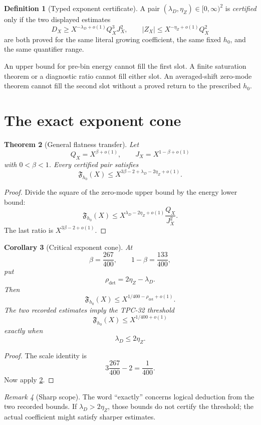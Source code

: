 \documentclass[11pt,a4paper]{article}
\newtheorem{theorem}{Theorem}[section]
\newtheorem{corollary}[theorem]{Corollary}
\theoremstyle{definition}
\newtheorem{definition}[theorem]{Definition}
\theoremstyle{remark}
\newtheorem{remark}[theorem]{Remark}
\newcommand{\Flat}{\mathfrak F}
\begin{document}
\begin{definition}[Typed exponent certificate]
A pair \((\lambda_D,\eta_Z)\in[0,\infty)^2\) is
\emph{certified} only if the two displayed estimates
\[
 D_X\ge X^{-\lambda_D+o(1)}Q_X^3J_X^2,\qquad
 |Z_X|\le X^{-\eta_Z+o(1)}Q_X^2
\]
are both proved for the same literal growing coefficient, the same
fixed \(h_0\), and the same quantifier range.
\end{definition}

An upper bound for pre-bin energy cannot fill the first slot.
A finite saturation theorem or a diagnostic ratio cannot fill either
slot.  An averaged-shift zero-mode theorem cannot fill the second
slot without a proved return to the prescribed \(h_0\).

\section{The exact exponent cone}

\begin{theorem}[General flatness transfer]
\label{thm:general}
Let
\[
 Q_X=X^{\beta+o(1)},\qquad
 J_X=X^{1-\beta+o(1)}
\]
with \(0<\beta<1\).  Every certified pair satisfies
\[
 \boxed{
 \Flat_{h_0}(X)
 \le
 X^{3\beta-2+\lambda_D-2\eta_Z+o(1)}.}
\]
\end{theorem}

\begin{proof}
Divide the square of the zero-mode upper bound by the energy lower
bound:
\[
 \Flat_{h_0}(X)
 \le
 X^{\lambda_D-2\eta_Z+o(1)}
 \frac{Q_X}{J_X^2}.
\]
The last ratio is \(X^{3\beta-2+o(1)}\).
\end{proof}

\begin{corollary}[Critical exponent cone]
\label{cor:cone}
At
\[
 \beta=\frac{267}{400},\qquad
 1-\beta=\frac{133}{400},
\]
put
\[
 \rho_{\mathrm{det}}=2\eta_Z-\lambda_D.
\]
Then
\[
 \boxed{
 \Flat_{h_0}(X)
 \le X^{1/400-\rho_{\mathrm{det}}+o(1)}.}
\]
The two recorded estimates imply the TPC-32 threshold
\citep{WangTPC32}
\[
 \Flat_{h_0}(X)\le X^{1/400+o(1)}
\]
exactly when
\[
 \boxed{\lambda_D\le2\eta_Z.}
\]
\end{corollary}

\begin{proof}
The scale identity is
\[
 3\frac{267}{400}-2=\frac1{400}.
\]
Now apply \cref{thm:general}.
\end{proof}

\begin{remark}[Sharp scope]
The word ``exactly'' concerns logical deduction from the two recorded
bounds.  If \(\lambda_D>2\eta_Z\), those bounds do not certify the
threshold; the actual coefficient might satisfy sharper estimates.
\end{remark}
\end{document}
